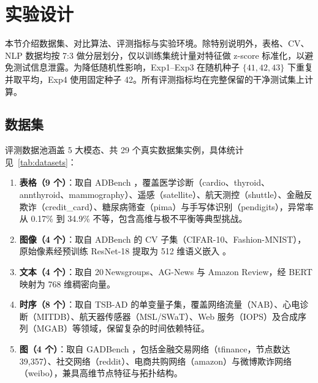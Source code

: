 \chapter{实验设计}\label{chap:setup}

本节介绍数据集、对比算法、评测指标与实验环境。除特别说明外，表格、CV、NLP 数据均按 7:3 做分层划分，仅以训练集统计量对特征做 z-score 标准化，以避免测试信息泄露。为降低随机性影响，Exp1--Exp3 在随机种子 $\{41,42,43\}$ 下重复并取平均，Exp4 使用固定种子 42。所有评测指标均在完整保留的干净测试集上计算。

\section{数据集}

评测数据池涵盖 5 大模态、共 29 个真实数据集实例，具体统计见~\ref{tab:datasets}：

\begin{enumerate}
    \item \textbf{表格（9 个）}：取自 ADBench \cite{han2022adbench}，覆盖医学诊断（cardio、thyroid、annthyroid、mammography）、遥感（satellite）、航天测控（shuttle）、金融反欺诈（credit\_card）、糖尿病筛查（pima）与手写体识别（pendigits），异常率从 0.17\% 到 34.9\% 不等，包含高维与极不平衡等典型挑战。
    \item \textbf{图像（4 个）}：取自 ADBench 的 CV 子集（CIFAR-10、Fashion-MNIST），原始像素经预训练 ResNet-18 提取为 512 维语义嵌入 \cite{conf1}。
    \item \textbf{文本（4 个）}：取自 20\,Newsgroups、AG-News 与 Amazon Review，经 BERT 映射为 768 维稠密向量。
    \item \textbf{时序（8 个）}：取自 TSB-AD \cite{paparrizos2024tsbad} 的单变量子集，覆盖网络流量（NAB）、心电诊断（MITDB）、航天器传感器（MSL/SWaT）、Web 服务（IOPS）及合成序列（MGAB）等领域，保留复杂的时间依赖特征。
    \item \textbf{图（4 个）}：取自 GADBench \cite{gadbench2024}，包括金融交易网络（tfinance，节点数达 39{,}357）、社交网络（reddit）、电商共购网络（amazon）与微博欺诈网络（weibo），兼具高维节点特征与拓扑结构。
\end{enumerate}

